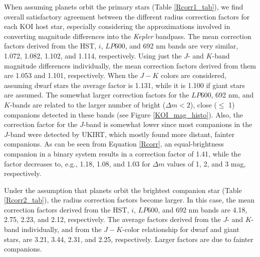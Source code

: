 \documentclass[twocolumn,appendixfloats]{aastex6}
\begin{document}
When assuming planets orbit the primary stars (Table \ref{Rcorr1_tab}),
we find overall satisfactory agreement between the different radius correction 
factors for each KOI host star, especially considering the approximations 
involved in converting magnitude differences into the {\it Kepler} bandpass. 
The mean correction factors derived from the HST, $i$, $LP600$, and 692 nm
bands are very similar, 1.072, 1.082, 1.102, and 1.114, respectively. 
Using just the $J$- and $K$-band magnitude differences individually, the mean 
correction factors derived from them are 1.053 and 1.101, respectively. 
When the $J-K$ colors are considered, assuming dwarf stars the average factor 
is 1.131, while it is 1.100 if giant stars are assumed. The somewhat larger 
correction factors for the $LP600$, 692 nm, and $K$-bands are related 
to the larger number of bright ($\Delta m <  2$), close ($\leq$ 1\arcsec) companions 
detected in these bands (see Figure \ref{KOI_mag_histo}). Also, the correction
factor for the $J$-band is somewhat lower since most companions in the 
$J$-band were detected by UKIRT, which mostly found more distant, fainter
companions.
As can be seen from Equation \ref{Rcorr}, an equal-brightness companion 
in a binary system results in a correction factor of 1.41, while the factor 
decreases to, e.g., 1.18, 1.08, and 1.03 for $\Delta m$ values of 1, 2, 
and 3 mag, respectively.

Under the assumption that planets orbit the brightest companion star
(Table \ref{Rcorr2_tab}), the radius correction factors become larger. 
In this case, the mean correction factors derived from the HST, 
$i$, $LP600$, and 692 nm bands are 4.18, 2.75, 2.23, and 2.12, 
respectively. The average factors derived from the $J$- and $K$-band 
individually, and from the $J-K$-color relationship for dwarf and
giant stars, are 3.21, 3.44, 2.31, and 2.25, respectively. 
Larger factors are due to fainter companions.
\end{document}
